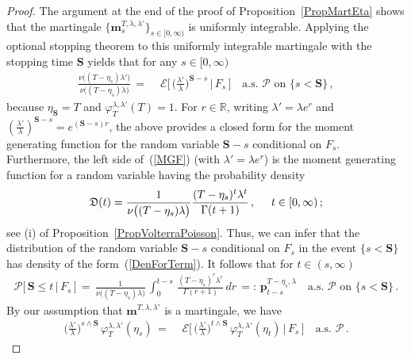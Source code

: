 \documentclass[10pt]{article}
\numberwithin{equation}{section}
\theoremstyle{definition}
\newcommand{\R}{{\mathbb R}}
\begin{document}
\begin{proof} The argument at the end of the proof of Proposition~\ref{PropMartEta} shows that the martingale $\{ \mathbf{m}_s^{T,\lambda,\lambda'}\}_{s\in [0,\infty)} $ is uniformly integrable. 
Applying the optional stopping theorem to this uniformly integrable  martingale   with the stopping time $\mathbf{S}$  yields that for any $s\in [0,\infty)$
\begin{align}\label{MGF}
\frac{ \nu\big((T-\eta_s)\lambda' \big)   }{  \nu\big((T-\eta_s)\lambda \big)    }\,=\,&\,\mathcal{E}\bigg[ \, \Big(\frac{\lambda'}{\lambda}\Big)^{\mathbf{S}-s}   \,\bigg|\,F_s \,\bigg] \quad \text{a.s.\ $\mathcal{P}$ on $\{s<\mathbf{S}\}  $} \,,
\end{align}
because $\eta_\mathbf{S}=T$ and $\varphi_T^{\lambda,\lambda'}(T)=1$.  For $r\in \R$, writing $\lambda'=\lambda e^r$ and $(\frac{\lambda'}{\lambda})^{\mathbf{S}-s}=e^{(\mathbf{S}-s)r }   $, the above provides a closed form for the   moment generating function for the random variable $\mathbf{S}-s$ conditional on $F_s$.  Furthermore, the left side of~(\ref{MGF}) (with $\lambda'=\lambda e^r$)  is the moment generating function for a random variable having the  probability density
\begin{align}\label{DenForTerm}
\mathfrak{D}(t)= \frac{1 }{  \nu\big((T-\eta_s) \lambda\big)    }\frac{ (T-\eta_s)^t  \lambda^t }{ \Gamma(t+1)  }\,,   \hspace{.5cm} t\in [0,\infty)  \,; 
\end{align}
see (i) of Proposition~\ref{PropVolterraPoisson}.  Thus, we can infer that  the distribution of the random variable $\mathbf{S}-s$ conditional on $F_s$ in the event $\{s<\mathbf{S}\}  $  has density of the form~(\ref{DenForTerm}). It follows that for $t\in (s,\infty)$
\begin{align}\label{DenForTerm2}
\mathcal{P}\big[\, \mathbf{S}\leq t\,\big|\,F_s \,\big]\,=\,\frac{1 }{  \nu\big((T-\eta_s)\lambda \big)    }\,\int_0^{t-s}\, \frac{ (T-\eta_s)^r \lambda^r  }{ \Gamma(r+1)  }\, dr\,=:\,\mathbf{p}_{t-s}^{T-\eta_s,\lambda  } \quad \text{a.s.\ $\mathcal{P}$ on $\{s<\mathbf{S}\}  $} \,.
\end{align}
  By our assumption that  $\mathbf{m}^{T,\lambda,\lambda'} $ is a martingale,  we have 
\begin{align*}
\Big(\frac{\lambda'}{\lambda}\Big)^{s\wedge \mathbf{S}} \,\varphi_T^{\lambda,\lambda'}(\eta_s) \,=\,&\,\mathcal{E}\bigg[\, \Big(\frac{\lambda'}{\lambda}\Big)^{t\wedge \mathbf{S}} \,\varphi_T^{\lambda,\lambda'}(\eta_t)  \,\bigg|\,F_s \,\bigg] \quad \text{a.s.\ $\mathcal{P}$} \,.

\end{align*}
\end{proof}
\end{document}

